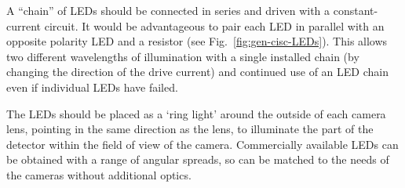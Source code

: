 A ``chain'' of LEDs should be connected in series and driven with a
constant-current circuit. It would be advantageous to pair each
LED in parallel with an opposite polarity LED and a resistor
(see Fig.~\ref{fig:gen-cisc-LEDs}).
This allows two different wavelengths of illumination with a single installed
chain (by changing the direction of the drive current) and 
continued use of an LED chain even if individual LEDs have failed.

The LEDs should be placed as a `ring light' around the outside of each
camera lens, pointing in the same direction as the lens, to 
illuminate the part of the detector within the field of
view of the camera. Commercially available LEDs can be obtained with
a range of angular spreads, so can be matched to the needs of the
cameras without additional optics. 

